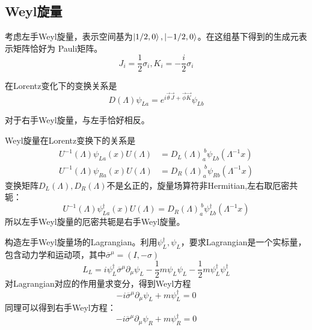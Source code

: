 \documentclass[aspectratio=1610,12pt]{beamer}
\begin{document}
\subsection{Weyl旋量}
\begin{frame}
    考虑左手Weyl旋量，表示空间基为$\ket{1/2,0},\ket{-1/2,0}$。在这组基下得到的生成元表示矩阵恰好为
    Pauli矩阵。
    \begin{equation}
        J_i=\frac{1}{2}\sigma_i, K_i=-\frac{i}{2}\sigma_i
    \end{equation}
    
    在Lorentz变化下的变换关系是
    \begin{equation}
        D(\Lambda)\psi_{La}=e^{i\vec{\theta}\vec{J}+\vec{\phi}\vec{K}}\psi_{Lb}
    \end{equation}

    对于右手Weyl旋量，与左手恰好相反。
\end{frame}
\begin{frame}
    Weyl旋量在Lorentz变换下的关系是
    \begin{align}
        U^{-1}(\Lambda)\psi_{La}(x)U(\Lambda)&=D_L(\Lambda)^{\ b}_{a}\psi_{Lb}(\Lambda^{-1}x)\\
        U^{-1}(\Lambda)\psi_{Ra}(x)U(\Lambda)&=D_R(\Lambda)^{\ b}_{a}\psi_{Rb}(\Lambda^{-1}x)
    \end{align}
    变换矩阵$D_L(\Lambda),D_R(\Lambda)$不是幺正的，旋量场算符非Hermitian,左右取厄密共轭：
    \begin{equation}
        U^{-1}(\Lambda)\psi^\dagger_{La}(x)U(\Lambda)=D_R(\Lambda)^{\ b}_{a}\psi^\dagger_{Lb}(\Lambda^{-1}x)
    \end{equation}
    所以左手Weyl旋量的厄密共轭是右手Weyl旋量。

    构造左手Weyl旋量场的Lagrangian。利用$\psi^\dagger_L,\psi_L$，要求Lagrangian是一个实标量，包含动力学和运动项，其中$\overline{\sigma}^{\mu}=(I,-\sigma)$
    \begin{equation}
        L_L=i\psi^\dagger_L\overline{\sigma}^\mu\partial_\mu\psi_L-\frac{1}{2}m\psi_L\psi_L-\frac{1}{2}m\psi^\dagger_L\psi^\dagger_L
    \end{equation}
    对Lagrangian对应的作用量求变分，得到Weyl方程
    \begin{equation}
        -i\overline{\sigma}^\mu\partial_\mu\psi_L+m\psi^\dagger_L=0
    \end{equation}
    同理可以得到右手Weyl方程：
    \begin{equation}
        -i\overline{\sigma}^\mu\partial_\mu\psi_R+m\psi^\dagger_R=0
    \end{equation}
\end{frame}
\end{document}
